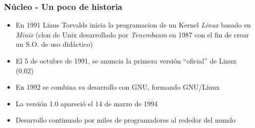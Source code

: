 \begin{frame}
	\frametitle{Núcleo - Un poco de historia}
	\begin{itemize}
		\item En 1991 Linus Torvalds inicia la programacion de un Kernel \textit{Linux} basado en \textit{Minix} (clon de Unix desarrollado por \emph{Tenembaum} en 1987 con el fin de crear un S.O. de uso didáctico)
		\item El 5 de octubre de 1991, se anuncia la primera versión ``oficial'' de Linux (0.02)
		\item En 1992 se combina su desarrollo con GNU, formando GNU/Linux
		\item La versión 1.0 apareció el 14 de marzo de 1994
		\item Desarrollo continuado por miles de programadores al rededor del mundo
	\end{itemize}
\end{frame}

